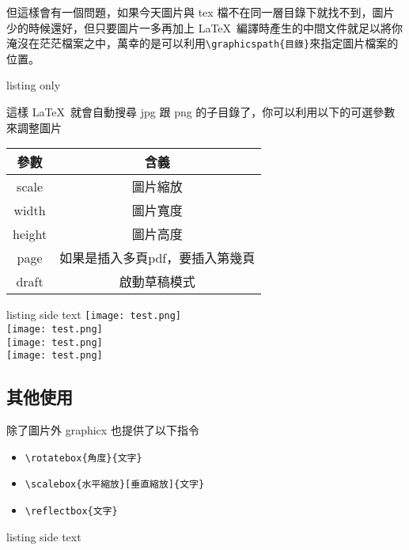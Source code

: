 但這樣會有一個問題，如果今天圖片與 tex 檔不在同一層目錄下就找不到，圖片少的時候還好，但只要圖片一多再加上 \LaTeX\ 編譯時產生的中間文件就足以將你淹沒在茫茫檔案之中，萬幸的是可以利用\verb|\graphicspath{目錄}|來指定圖片檔案的位置。

\begin{tcblisting}{listing only}
\graphicspath{{jpg/}{png/}}
\end{tcblisting}

這樣 \LaTeX\ 就會自動搜尋 jpg 跟 png 的子目錄了，你可以利用以下的可選參數來調整圖片

\begin{tabular}{cc}
\hline
參數 & 含義 \\\hline\hline
scale & 圖片縮放 \\\hline
width & 圖片寬度 \\\hline
height & 圖片高度 \\\hline
page & 如果是插入多頁pdf，要插入第幾頁 \\\hline
draft & 啟動草稿模式 \\\hline
\end{tabular}

\begin{tcblisting}{listing side text}
\texttt{[image: test.png]}\\
\texttt{[image: test.png]}\\
\texttt{[image: test.png]}\\
\texttt{[image: test.png]}
\end{tcblisting}

\subsection{其他使用}

除了圖片外 graphicx 也提供了以下指令

\begin{itemize}
\item \verb|\rotatebox{角度}{文字}|
\item \verb|\scalebox{水平縮放}[垂直縮放]{文字}|
\item \verb|\reflectbox{文字}|
\end{itemize}

\begin{tcblisting}{listing side text}
\\
\\
\\
\\
\end{tcblisting}

